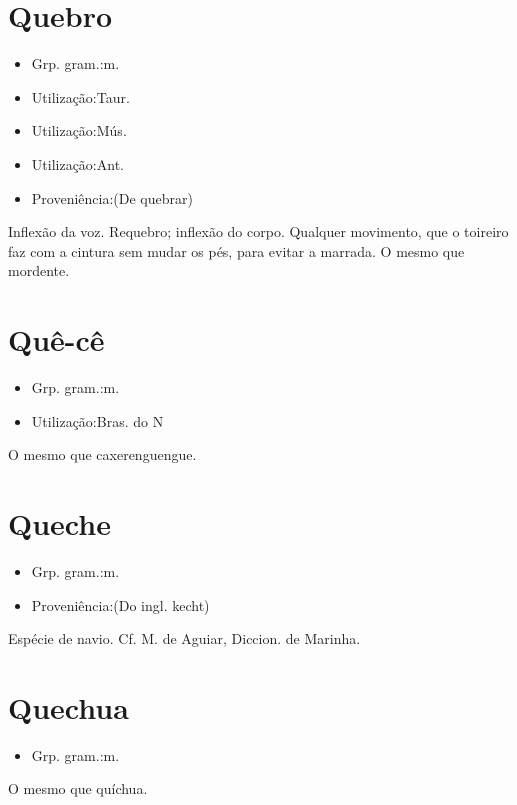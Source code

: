 \section{Quebro}
\begin{itemize}
\item {Grp. gram.:m.}
\end{itemize}
\begin{itemize}
\item {Utilização:Taur.}
\end{itemize}
\begin{itemize}
\item {Utilização:Mús.}
\end{itemize}
\begin{itemize}
\item {Utilização:Ant.}
\end{itemize}
\begin{itemize}
\item {Proveniência:(De \textunderscore quebrar\textunderscore )}
\end{itemize}
Inflexão da voz.
Requebro; inflexão do corpo.
Qualquer movimento, que o toireiro faz com a cintura sem mudar os pés, para evitar a marrada.
O mesmo que \textunderscore mordente\textunderscore .
\section{Quê-cê}
\begin{itemize}
\item {Grp. gram.:m.}
\end{itemize}
\begin{itemize}
\item {Utilização:Bras. do N}
\end{itemize}
O mesmo que \textunderscore caxerenguengue\textunderscore .
\section{Queche}
\begin{itemize}
\item {Grp. gram.:m.}
\end{itemize}
\begin{itemize}
\item {Proveniência:(Do ingl. \textunderscore kecht\textunderscore )}
\end{itemize}
Espécie de navio. Cf. M. de Aguiar, \textunderscore Diccion. de Marinha\textunderscore .
\section{Quechua}
\begin{itemize}
\item {Grp. gram.:m.}
\end{itemize}
O mesmo que \textunderscore quíchua\textunderscore .

